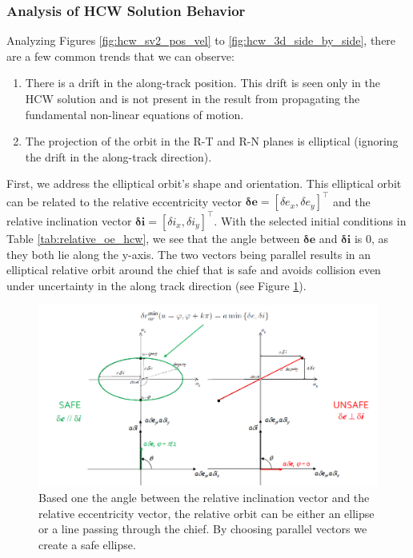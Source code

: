 \subsubsection{Analysis of HCW Solution Behavior}\label{sec:analysis_of_hcw}
Analyzing Figures \ref{fig:hcw_sv2_pos_vel}
to \ref{fig:hcw_3d_side_by_side}, there are a few common trends that we can observe:
\begin{enumerate}
    \item There is a drift in the along-track position. This drift is seen only in the HCW solution and is not present in the result from propagating the fundamental non-linear equations of motion.
    \item The projection of the orbit in the R-T and R-N planes is elliptical (ignoring the drift in the along-track direction).
\end{enumerate}

First, we address the elliptical orbit's shape and orientation. This elliptical orbit can be related to the relative eccentricity vector $\boldsymbol{\delta e} = [\delta e_x, \delta e_y]^\top$ and the relative inclination vector $\boldsymbol{\delta i} = [\delta i_x, \delta i_y]^\top$. With the selected initial conditions in Table \ref{tab:relative_oe_hcw}, we see that the angle between $\boldsymbol{\delta e}$ and $\boldsymbol{\delta i}$ is $0$, as they both lie along the y-axis. The two vectors being parallel results in an elliptical relative orbit around the chief that is safe and avoids collision even under uncertainty in the along track direction (see Figure \ref{fig:relative_orbit_geometry}).

\begin{figure}[htpb]
    \centering
    \includegraphics[width=0.75\linewidth]{LaTeX//PS3/relative_orbit_geometry.png}
    \caption{Based one the angle between the relative inclination vector and the relative eccentricity vector, the relative orbit can be either an ellipse or a line passing through the chief. By choosing parallel vectors we create a safe ellipse.}
    \label{fig:relative_orbit_geometry}
\end{figure}

